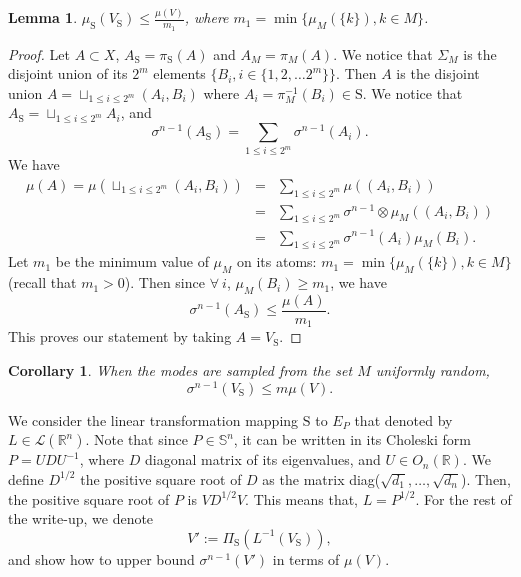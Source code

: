 \documentclass[letterpaper, 10 pt, conference]{ieeeconf}  %
\newcommand{\proj}{\Pi }
\newcommand{\sphere}{\text{S}}
\newtheorem{lemma}[theorem]{Lemma}
\newtheorem{corollary}[theorem]{Corollary}
\begin{document}
\begin{lemma}$\mu_{\sphere}(V_\sphere) \leq \frac{\mu(V)}{m_1}$, where $m_1 = \min \{\mu_M(\{k\}), k \in M\}$.\end{lemma}
\begin{proof}

Let $A \subset X$, $A_{\sphere} = \pi_{\sphere} (A)$ and $A_M = \pi_M (A)$. We notice that $\Sigma_M$ is the disjoint union of its $2^m$ elements $\{B_i, i \in \{1,2, \ldots 2^m\} \}$. Then $A$ is the disjoint union $A = \sqcup_{1 \leq i \leq 2^m} (A_i, B_i)$ where $A_i = \pi_M^{-1} (B_i) \in \sphere$. We notice that 
$A_{\sphere} = \sqcup_{1 \leq i \leq 2^m} A_i$, 
and
\begin{equation*}
\sigma^{n-1} (A_{\sphere}) = \sum_{1 \leq i \leq 2^m} \sigma^{n-1} (A_i).
\end{equation*}
We have 
\begin{eqnarray*}
\mu(A) = \mu(\sqcup_{1 \leq i \leq 2^m} (A_i, B_i)) &=& \sum_{1 \leq i \leq 2^m} \mu( (A_i, B_i)) \\
 &=& \sum_{1 \leq i \leq 2^m} \sigma^{n-1} \otimes \mu_M ((A_i, B_i)) \\
 & = &\sum_{1 \leq i \leq 2^m} \sigma^{n-1}(A_i) \mu_M (B_i).
\end{eqnarray*}
Let $m_1$ be the minimum value  of $\mu_M$ on its atoms: $m_1 = \min \{\mu_M(\{k\}), k \in M\}$ (recall that $m_1 > 0$). Then since $ \forall \ i$, $\mu_M(B_i) \geq m_1$, we have
\begin{equation}
\sigma^{n-1}(A_{\sphere}) \leq \frac{\mu(A)}{m_1}.
\end{equation}
This proves our statement by taking $A = V_{\sphere}$.
\end{proof}

\begin{corollary} \label{cor:measure}When the modes are sampled from the set $M$ uniformly random, 
\begin{equation*}\sigma^{n-1}(V_\sphere) \leq m \mu(V). \end{equation*}
\end{corollary}

We consider the linear transformation mapping $\sphere$ to $E_P$ that denoted by $L \in \mathcal{L}(\mathbb{R}^n)$. Note that since $P \in \mathbb{S}^n$, it can be written in its Choleski form $P = U D U^{-1}$, where 
$D$ diagonal matrix of its eigenvalues, and $U \in O_n(\mathbb{R})$. We define $D^{1/2}$ the positive square root of $D$ as the matrix diag($\sqrt{d_1},\dots, \sqrt{d_n}$). Then, the positive square root of $P$ is $V D^{1/2} V$. This means that, $L = P^{1/2}$. For the rest of the write-up, we denote $$V':=\proj_{\sphere}(L^{-1}(V_\sphere)),$$ and show how to upper bound $\sigma^{n-1}(V')$ in terms of $\mu(V)$.
\end{document}
